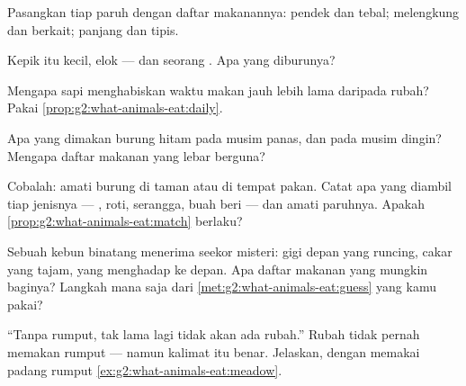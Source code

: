 \begin{exercise}[$\star$]\label{exo:g2:what-animals-eat:4}
Pasangkan tiap paruh dengan daftar makanannya: pendek dan tebal;
melengkung dan berkait; panjang dan tipis.
\end{exercise}

\begin{exercise}[$\star$]\label{exo:g2:what-animals-eat:5}
Kepik itu kecil, elok --- dan seorang . Apa yang diburunya?
\end{exercise}

\begin{exercise}[$\star$]\label{exo:g2:what-animals-eat:6}
Mengapa sapi menghabiskan waktu makan jauh lebih lama daripada rubah?
Pakai \cref{prop:g2:what-animals-eat:daily}.
\end{exercise}

\begin{exercise}[$\star$]\label{exo:g2:what-animals-eat:7}
Apa yang dimakan burung hitam pada musim panas, dan pada musim dingin?
Mengapa daftar makanan yang lebar berguna?
\end{exercise}

\begin{exercise}[$\star$]\label{exo:g2:what-animals-eat:8}
Cobalah: amati burung di taman atau di tempat pakan. Catat apa yang
diambil tiap jenisnya --- , roti, serangga, buah beri --- dan
amati paruhnya. Apakah \cref{prop:g2:what-animals-eat:match} berlaku?
\end{exercise}

\begin{exercise}[$\star\star$]\label{exo:g2:what-animals-eat:9}
Sebuah kebun binatang menerima seekor  misteri: gigi depan yang
runcing, cakar yang tajam,  yang menghadap ke depan. Apa daftar
makanan yang mungkin baginya? Langkah mana saja dari
\cref{met:g2:what-animals-eat:guess} yang kamu pakai?
\end{exercise}

\begin{exercise}[$\star\star$]\label{exo:g2:what-animals-eat:10}
``Tanpa rumput, tak lama lagi tidak akan ada rubah.'' Rubah tidak
pernah memakan rumput --- namun kalimat itu benar. Jelaskan, dengan
memakai padang rumput \cref{ex:g2:what-animals-eat:meadow}.
\end{exercise}
